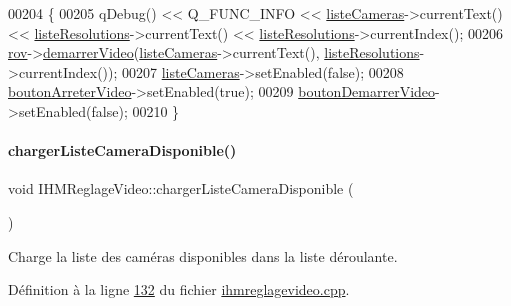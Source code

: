 \begin{DoxyCode}
00204 \{
00205     qDebug() << Q\_FUNC\_INFO << \hyperlink{class_i_h_m_reglage_video_a38a35548ddd0e5750917305ac6f32142}{listeCameras}->currentText() << 
      \hyperlink{class_i_h_m_reglage_video_ad897355a4350d95f5f219db57ff68d4f}{listeResolutions}->currentText() << \hyperlink{class_i_h_m_reglage_video_ad897355a4350d95f5f219db57ff68d4f}{listeResolutions}->currentIndex();
00206     \hyperlink{class_i_h_m_reglage_video_a755736fe361e651453de6bc21725a626}{rov}->\hyperlink{class_rov_aaf1a53557b6e8f0ae2497a0af93bd6db}{demarrerVideo}(\hyperlink{class_i_h_m_reglage_video_a38a35548ddd0e5750917305ac6f32142}{listeCameras}->currentText(), 
      \hyperlink{class_i_h_m_reglage_video_ad897355a4350d95f5f219db57ff68d4f}{listeResolutions}->currentIndex());
00207     \hyperlink{class_i_h_m_reglage_video_a38a35548ddd0e5750917305ac6f32142}{listeCameras}->setEnabled(\textcolor{keyword}{false});
00208     \hyperlink{class_i_h_m_reglage_video_a705db68dd445a91a4144a3c9bf95a9cf}{boutonArreterVideo}->setEnabled(\textcolor{keyword}{true});
00209     \hyperlink{class_i_h_m_reglage_video_a98d33390551ab92165f192be44f6361d}{boutonDemarrerVideo}->setEnabled(\textcolor{keyword}{false});
00210 \}
\end{DoxyCode}
\mbox{\label{class_i_h_m_reglage_video_a0a480faa747bc705b4cf49df4ecc1d44}} 
\paragraph{\texorpdfstring{charger\+Liste\+Camera\+Disponible()}{chargerListeCameraDisponible()}}
{\footnotesize\ttfamily void I\+H\+M\+Reglage\+Video\+::charger\+Liste\+Camera\+Disponible (\begin{DoxyParamCaption}{ }\end{DoxyParamCaption})\hspace{0.3cm}{\ttfamily [private]}}



Charge la liste des caméras disponibles dans la liste déroulante. 



Définition à la ligne \hyperlink{ihmreglagevideo_8cpp_source_l00132}{132} du fichier \hyperlink{ihmreglagevideo_8cpp_source}{ihmreglagevideo.\+cpp}.



